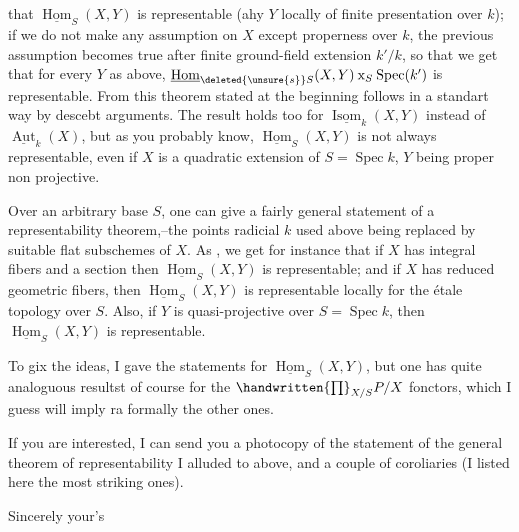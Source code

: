that $\underline{\operatorname{Hom}}_S(X,Y)$ is representable (ahy $Y$ locally of finite presentation  over $k$); if we do not make any assumption on $X$ except properness over $k$, the previous assumption becomes true after finite ground-field extension $k'/k$, so that we get that for every $Y$ as above, $\underline{\operatorname{Hom}}_{\deleted{\unsure{s}}S}(X,Y)\mathbin{\mathrm{x}}_S\operatorname{Spec}(k')$ is representable. From this  theorem stated at the beginning follows in a standart way by descebt arguments. The result holds too for $\underline{\operatorname{Isom}}_k(X,Y)$ instead of $\underline{\operatorname{Aut}}_k(X)$, but as you probably know, $\underline{\operatorname{Hom}}_S(X,Y)$ is not always representable, even if $X$ is a quadratic extension of $S=\operatorname{Spec}k$, $Y$ being proper non projective.

Over an arbitrary base $S$, one can give a fairly general statement of a representability theorem,--the points radicial  $k$ used above being replaced by suitable flat subschemes of $X$. As , we get for instance that if $X$ has integral  fibers and a section  then $\underline{\operatorname{Hom}}_S(X,Y)$ is representable; and if $X$ has reduced geometric fibers, then $\underline{\operatorname{Hom}}_S(X,Y)$ is representable locally for the étale topology over $S$. Also, if $Y$ is quasi-projective over $S=\operatorname{Spec}k$, then $\underline{\operatorname{Hom}}_S(X,Y)$ is representable.

To gix the ideas, I gave the statements for $\underline{\operatorname{Hom}}_S(X,Y)$, but one has quite analoguous resultst of course for the $\handwritten{\prod}_{X/S}P/X$ fonctors, which I guess will imply ra formally the other ones.

If you are interested, I can send you a photocopy of the statement of the general theorem of representability I alluded to\deleted{\unsure{,}} above, and a couple of coroliaries (I  listed here the most striking ones).

Sincerely your's\\

